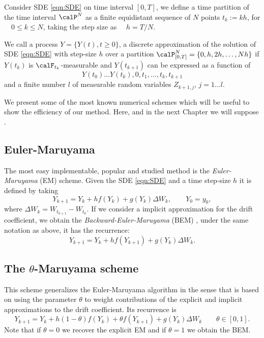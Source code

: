 	Consider SDE \eqref{eqn:SDE} on time interval $[0,T]$, we define a time
partition of the time interval $\calP^{N}$ as a finite equidistant sequence of $N$ points 
$t_k:=kh$, for $\quad 0\leq k\leq N$, taking the step size as $\quad h =T/N$.
\begin{definition}\label{dfn:ATD}
	We call a process $Y=\{Y(t),t\geq 0 \}$, a discrete approximation of the solution of SDE
	\eqref{eqn:SDE} with step-size $h$ over a partition 
	$\calP_{[0,T]}^N =\{0, h, 2h, \ldots, N h\} $ if $Y(t_k)$ is $\calF_{t_{k}}$-measurable and
	$Y(t_{k+1})$ can be expressed as a function of 
	$$Y(t_0)\ldots Y(t_k), 0,t_1, \ldots, t_k, t_{k+1}$$
	and a finite number $l$ of measurable random variables $Z_{k+1,j}$, $j=1\ldots l$.
\end{definition}
%
	We present some of the most known numerical  schemes which will be useful 
to show the efficiency of our method. Here, and in the next Chapter we will suppose 
.
\subsection*{Euler-Maruyama}
	The most easy implementable, popular and studied method is the \emph{Euler-Maruyama} (EM) scheme. Given the SDE 
	\eqref{eqn:SDE} and a 
	time step-size $h$ it is defined by taking  
	\begin{equation}\label{eqn:EulerMaruyama}
		Y_{k+1}= Y_k + h f(Y_k) + g(Y_k)\Delta W_k, \qquad Y_0=y_0,
	\end{equation}
	where $\Delta W_k =W_{t_{k+1}}-W_{t_k}$. 
	If we consider a implicit approximation for the drift coefficient, we obtain  the \emph{Backward-Euler-Maruyama}
	(BEM) \cite{Mao2013}, under the same notation as above, it has the recurrence:
	\begin{equation}\label{eqn:BackwardEM}
		Y_{k+1} = Y_k + h f(Y_{k+1}) + g(Y_k)\Delta W_k.
	\end{equation}
\subsection*{The $\theta$-Maruyama scheme}
		This scheme generalizes the Euler-Maruyama algorithm in the sense that is based on using the parameter $\theta$ 
	to weight contributions of the explicit and implicit approximations to the drift coefficient.  Its  recurrence 
	is  
	\begin{equation}\label{eqn:ThetaEM}
		Y_{k+1} = Y_k + h(1-\theta)f(Y_{k}) + 
		\theta f(Y_{k+1}) +
		g(Y_k)\Delta W_k \qquad \theta \in [0,1].
	\end{equation}
	Note that if $\theta = 0$ we recover the explicit EM and if $\theta = 1$ we obtain the BEM.
